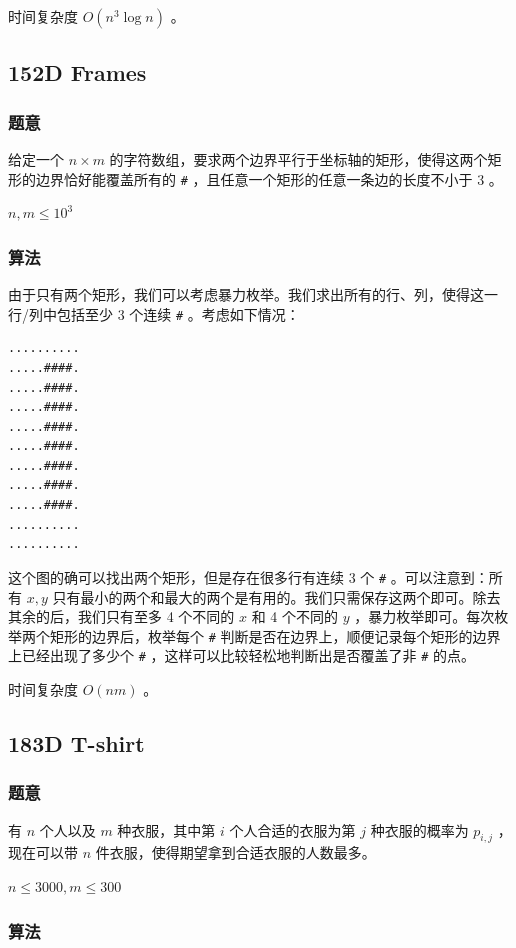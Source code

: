 \documentclass[11pt]{article}
\begin{document}
    时间复杂度 $O(n^3 \log n)$ 。
\subsection{152D  Frames}
\label{sec-9-5}
\subsubsection{题意}
\label{sec-9-5-1}

    给定一个 $n \times m$ 的字符数组，要求两个边界平行于坐标轴的矩形，使得这两个矩形的边界恰好能覆盖所有的 \texttt{\#} ，且任意一个矩形的任意一条边的长度不小于 3 。

    $n, m \leq 10^3$
\subsubsection{算法}
\label{sec-9-5-2}

    由于只有两个矩形，我们可以考虑暴力枚举。我们求出所有的行、列，使得这一行/列中包括至少 3 个连续 \texttt{\#} 。考虑如下情况：
\begin{verbatim}
..........
.....####.
.....####.
.....####.
.....####.
.....####.
.....####.
.....####.
.....####.
..........
..........
\end{verbatim}

    这个图的确可以找出两个矩形，但是存在很多行有连续 3 个 \texttt{\#} 。可以注意到：所有 $x, y$ 只有最小的两个和最大的两个是有用的。我们只需保存这两个即可。除去其余的后，我们只有至多 4 个不同的 $x$ 和 4 个不同的 $y$ ，暴力枚举即可。每次枚举两个矩形的边界后，枚举每个 \texttt{\#} 判断是否在边界上，顺便记录每个矩形的边界上已经出现了多少个 \texttt{\#} ，这样可以比较轻松地判断出是否覆盖了非 \texttt{\#} 的点。

    时间复杂度 $O(nm)$ 。
\subsection{183D  T-shirt}
\label{sec-9-6}
\subsubsection{题意}
\label{sec-9-6-1}

    有 $n$ 个人以及 $m$ 种衣服，其中第 $i$ 个人合适的衣服为第 $j$ 种衣服的概率为 $p_{i, j}$ ，现在可以带 $n$ 件衣服，使得期望拿到合适衣服的人数最多。

    $n \leq 3000, m \leq 300$
\subsubsection{算法}
\label{sec-9-6-2}
\end{document}
